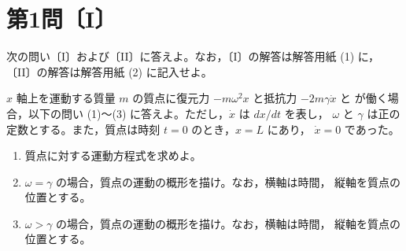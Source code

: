 \section*{第1問〔I〕}

次の問い〔I〕および〔II〕に答えよ。なお，〔I〕の解答は解答用紙 (1) に，
〔II〕の解答は解答用紙 (2) に記入せよ。

\medskip
$x$ 軸上を運動する質量 $m$ の質点に復元力 $-m\omega^2 x$ と抵抗力 $-2m\gamma\dot{x}$ と
が働く場合，以下の問い (1)〜(3) に答えよ。ただし，$\dot{x}$ は $dx/dt$ を表し，
$\omega$ と $\gamma$ は正の定数とする。また，質点は時刻 $t=0$ のとき，$x=L$ にあり，
$\dot{x}=0$ であった。

\begin{enumerate}[label=(\arabic*)]
  \item 質点に対する運動方程式を求めよ。
  \item $\omega=\gamma$ の場合，質点の運動の概形を描け。なお，横軸は時間，
        縦軸を質点の位置とする。
  \item $\omega>\gamma$ の場合，質点の運動の概形を描け。なお，横軸は時間，
        縦軸を質点の位置とする。
\end{enumerate}
